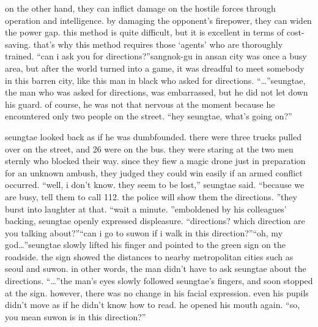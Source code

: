  on the other hand, they can inflict damage on the hostile forces through operation and intelligence.
 by damaging the opponent’s firepower, they can widen the power gap.
this method is quite difficult, but it is excellent in terms of cost-saving.
 that’s why this method requires those ‘agents’ who are thoroughly trained.
“can i ask you for directions?”sangnok-gu in ansan city was once a busy area, but after the world turned into a game, it was dreadful to meet somebody in this barren city, like this man in black who asked for directions.
“…”seungtae, the man who was asked for directions, was embarrassed, but he did not let down his guard.
 of course, he was not that nervous at the moment because he encountered only two people on the street.
“hey seungtae, what’s going on?”

seungtae looked back as if he was dumbfounded.
 there were three trucks pulled over on the street, and 26 were on the bus.
 they were staring at the two men sternly who blocked their way.
since they fiew a magic drone just in preparation for an unknown ambush, they judged they could win easily if an armed conflict occurred.
“well, i don’t know.
 they seem to be lost,” seungtae said.
“because we are busy, tell them to call 112.
 the police will show them the directions.
”they burst into laughter at that.
“wait a minute.
”emboldened by his colleagues’ backing, seungtae openly expressed displeasure.
“directions? which direction are you talking about?”“can i go to suwon if i walk in this direction?”“oh, my god…”seungtae slowly lifted his finger and pointed to the green sign on the roadside.
the sign showed the distances to nearby metropolitan cities such as seoul and suwon.
in other words, the man didn’t have to ask seungtae about the directions.
“…”the man’s eyes slowly followed seungtae’s fingers, and soon stopped at the sign.
however, there was no change in his facial expression.
 even his pupils didn’t move as if he didn’t know how to read.
he opened his mouth again.
“so, you mean suwon is in this direction?”

 